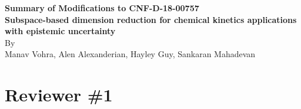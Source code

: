 \documentclass[11pt,final]{article}
\begin{document}
\begin{center}
{\bf Summary of Modifications to CNF-D-18-00757}\\[6pt]
{\bf Subspace-based dimension reduction for chemical kinetics applications with 
epistemic uncertainty}\\[6pt]
By \\
Manav Vohra, Alen Alexanderian, Hayley Guy, Sankaran Mahadevan 
\end{center}

\baselineskip=22pt


\vspace*{1in}


\clearpage


\section*{Reviewer \#1}
\end{document}
